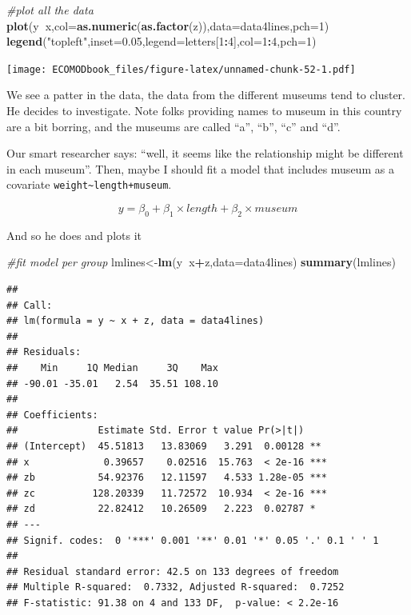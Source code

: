 \documentclass[
]{book}
\newenvironment{Shaded}{\begin{snugshade}}{\end{snugshade}}
\newcommand{\CommentTok}[1]{\textcolor[rgb]{0.56,0.35,0.01}{\textit{#1}}}
\newcommand{\DataTypeTok}[1]{\textcolor[rgb]{0.13,0.29,0.53}{#1}}
\newcommand{\DecValTok}[1]{\textcolor[rgb]{0.00,0.00,0.81}{#1}}
\newcommand{\FloatTok}[1]{\textcolor[rgb]{0.00,0.00,0.81}{#1}}
\newcommand{\KeywordTok}[1]{\textcolor[rgb]{0.13,0.29,0.53}{\textbf{#1}}}
\newcommand{\NormalTok}[1]{#1}
\newcommand{\OperatorTok}[1]{\textcolor[rgb]{0.81,0.36,0.00}{\textbf{#1}}}
\newcommand{\StringTok}[1]{\textcolor[rgb]{0.31,0.60,0.02}{#1}}
\begin{document}
\begin{Shaded}
\begin{Highlighting}[]
\CommentTok{#plot all the data}
\KeywordTok{plot}\NormalTok{(y}\OperatorTok{~}\NormalTok{x,}\DataTypeTok{col=}\KeywordTok{as.numeric}\NormalTok{(}\KeywordTok{as.factor}\NormalTok{(z)),}\DataTypeTok{data=}\NormalTok{data4lines,}\DataTypeTok{pch=}\DecValTok{1}\NormalTok{)}
\KeywordTok{legend}\NormalTok{(}\StringTok{"topleft"}\NormalTok{,}\DataTypeTok{inset=}\FloatTok{0.05}\NormalTok{,}\DataTypeTok{legend=}\NormalTok{letters[}\DecValTok{1}\OperatorTok{:}\DecValTok{4}\NormalTok{],}\DataTypeTok{col=}\DecValTok{1}\OperatorTok{:}\DecValTok{4}\NormalTok{,}\DataTypeTok{pch=}\DecValTok{1}\NormalTok{)}
\end{Highlighting}
\end{Shaded}

\texttt{[image: ECOMODbook\_files/figure-latex/unnamed-chunk-52-1.pdf]}

We see a patter in the data, the data from the different museums tend to cluster. He decides to investigate. Note folks providing names to museum in this country are a bit borring, and the museums are called ``a'', ``b'', ``c'' and ``d''.

Our smart researcher says: ``well, it seems like the relationship might be different in each museum''. Then, maybe I should fit a model that includes museum as a covariate \texttt{weight\textasciitilde{}length+museum}.

\[y=\beta_0+\beta_1 \times length +\beta_2 \times museum\]

And so he does and plots it

\begin{Shaded}
\begin{Highlighting}[]
\CommentTok{#fit model per group}
\NormalTok{lmlines<-}\KeywordTok{lm}\NormalTok{(y}\OperatorTok{~}\NormalTok{x}\OperatorTok{+}\NormalTok{z,}\DataTypeTok{data=}\NormalTok{data4lines)}
\KeywordTok{summary}\NormalTok{(lmlines)}
\end{Highlighting}
\end{Shaded}

\begin{verbatim}
## 
## Call:
## lm(formula = y ~ x + z, data = data4lines)
## 
## Residuals:
##    Min     1Q Median     3Q    Max 
## -90.01 -35.01   2.54  35.51 108.10 
## 
## Coefficients:
##              Estimate Std. Error t value Pr(>|t|)    
## (Intercept)  45.51813   13.83069   3.291  0.00128 ** 
## x             0.39657    0.02516  15.763  < 2e-16 ***
## zb           54.92376   12.11597   4.533 1.28e-05 ***
## zc          128.20339   11.72572  10.934  < 2e-16 ***
## zd           22.82412   10.26509   2.223  0.02787 *  
## ---
## Signif. codes:  0 '***' 0.001 '**' 0.01 '*' 0.05 '.' 0.1 ' ' 1
## 
## Residual standard error: 42.5 on 133 degrees of freedom
## Multiple R-squared:  0.7332,	Adjusted R-squared:  0.7252 
## F-statistic: 91.38 on 4 and 133 DF,  p-value: < 2.2e-16
\end{verbatim}
\end{document}
